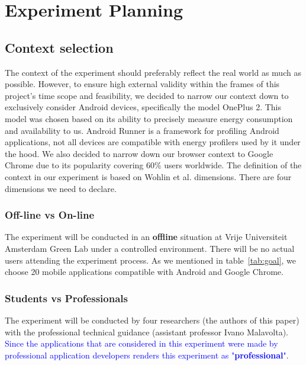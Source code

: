 \section{Experiment Planning}\label{sec:planning}

	\subsection{Context selection}
The context of the experiment should preferably reflect the real world as much as possible. However, to ensure high external validity within the frames of this project's time scope and feasibility, we decided to narrow our context down to exclusively consider Android devices, specifically the model OnePlus 2. \cite{op2} This model was chosen based on its ability to precisely measure energy consumption and availability to us. Android Runner \cite{androidrunner} is a framework for profiling Android applications, not all devices are compatible with energy profilers used by it under the hood. We also decided to narrow down our browser context to Google Chrome due to its popularity covering 60\% users worldwide.\cite{Chromestats} The definition of the context in our experiment is based on Wohlin et al. dimensions. \cite{wohlin12} There are four dimensions we need to declare.
	\\
	\subsubsection*{Off-line vs On-line}
	The experiment will be conducted in an \textbf{offline} situation at Vrije Universiteit Amsterdam Green Lab under a controlled environment. There will be no actual users attending the experiment process. As we mentioned in table~\ref{tab:goal}, we choose 20 mobile applications compatible with Android and Google Chrome.
	\\
	\subsubsection*{Students vs Professionals}
	The experiment will be conducted by four researchers (the authors of this paper) with the professional technical guidance (assistant professor Ivano Malavolta). \textcolor{blue}{Since the applications that are considered in this experiment were made by professional application developers renders this experiment as "\textbf{professional}"}.   
	\\
